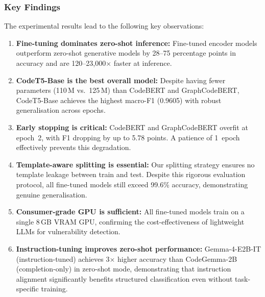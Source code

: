 \documentclass[conference]{IEEEtran}
\begin{document}
\subsubsection{Key Findings}
The experimental results lead to the following key observations:
\begin{enumerate}
    \item \textbf{Fine-tuning dominates zero-shot inference:}
          Fine-tuned encoder models outperform zero-shot generative models by
          28--75 percentage points in accuracy and are 120--23,000$\times$
          faster at inference.
    \item \textbf{CodeT5-Base is the best overall model:}
          Despite having fewer parameters (110\,M vs.\ 125\,M) than
          CodeBERT and GraphCodeBERT, CodeT5-Base achieves the highest
          macro-F1 (0.9605) with robust generalisation across epochs.
    \item \textbf{Early stopping is critical:}
          CodeBERT and GraphCodeBERT overfit at epoch~2, with F1 dropping by
          up to 5.78 points.  A patience of 1~epoch effectively prevents
          this degradation.
    \item \textbf{Template-aware splitting is essential:}
          Our splitting strategy ensures no template leakage between train
          and test.  Despite this rigorous evaluation protocol, all
          fine-tuned models still exceed 99.6\% accuracy, demonstrating
          genuine generalisation.
    \item \textbf{Consumer-grade GPU is sufficient:}
          All fine-tuned models train on a single 8\,GB
          VRAM GPU, confirming the cost-effectiveness of lightweight LLMs
          for vulnerability detection.
    \item \textbf{Instruction-tuning improves zero-shot performance:}
          Gemma-4-E2B-IT (instruction-tuned) achieves 3$\times$ higher
          accuracy than CodeGemma-2B (completion-only) in zero-shot mode,
          demonstrating that instruction alignment significantly benefits
          structured classification even without task-specific training.
\end{enumerate}
\end{document}
